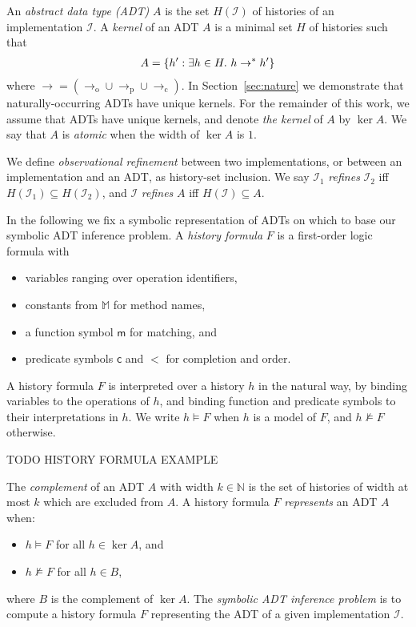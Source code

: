 An \emph{abstract data type (ADT)} $A$ is the set $H(\mathcal{I})$ of histories
of an implementation $\mathcal{I}$. A \emph{kernel} of an ADT $A$ is a minimal
set $H$ of histories such that
\begin{align*}
  A = {\{{ h' : \exists h \in H.\ h \to^\ast h' }\}}
\end{align*}
where $\to = (\to_\mathrm{o} \cup \to_\mathrm{p} \cup \to_\mathrm{c})$. In
Section~\ref{sec:nature} we demonstrate that naturally-occurring ADTs have
unique kernels. For the remainder of this work, we assume that ADTs have unique
kernels, and denote \emph{the kernel} of $A$ by $\ker A$. We say that $A$ is
\emph{atomic} when the width of $\ker A$ is $1$.

We define \emph{observational refinement} between two implementations, or
between an implementation and an ADT, as history-set inclusion. We say
$\mathcal{I}_1$ \emph{refines} $\mathcal{I}_2$ if{f} $H(\mathcal{I}_1)
\subseteq H(\mathcal{I}_2)$, and $\mathcal{I}$ \emph{refines} $A$ if{f}
$H(\mathcal{I}) \subseteq A$.

In the following we fix a symbolic representation of ADTs on which to base our
symbolic ADT inference problem. A \emph{history formula} $F$ is a first-order
logic formula with
\begin{itemize}

  \item variables ranging over operation identifiers,

  \item constants from $\mathbb{M}$ for method names,

  \item a function symbol $\mathsf{m}$ for matching, and

  \item predicate symbols $\mathsf{c}$ and $\mathsf{<}$ for completion and
  order.

\end{itemize}
A history formula $F$ is interpreted over a history $h$ in the natural way, by
binding variables to the operations of $h$, and binding function and predicate
symbols to their interpretations in $h$. We write $h \models F$ when $h$ is a
model of $F$, and $h \not\models F$ otherwise.

\begin{example}

  TODO HISTORY FORMULA EXAMPLE

\end{example}

The \emph{complement} of an ADT $A$ with width $k \in \mathbb{N}$ is the set of
histories of width at most $k$ which are excluded from $A$. A history formula
$F$ \emph{represents} an ADT $A$ when:
\begin{itemize}

  \item $h \models F$ for all $h \in \ker A$, and

  \item $h \not\models F$ for all $h \in B$,

\end{itemize}
where $B$ is the complement of $\ker A$. The \emph{symbolic ADT inference
problem} is to compute a history formula $F$ representing the ADT of a given
implementation $\mathcal{I}$.
